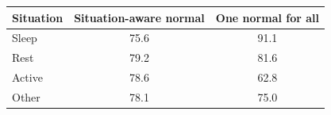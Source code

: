 \begin{tabular}{lcc}
\toprule
Situation & Situation-aware normal & One normal for all \\
\midrule
Sleep & 75.6 & 91.1 \\
Rest & 79.2 & 81.6 \\
Active & 78.6 & 62.8 \\
Other & 78.1 & 75.0 \\
\bottomrule
\end{tabular}
